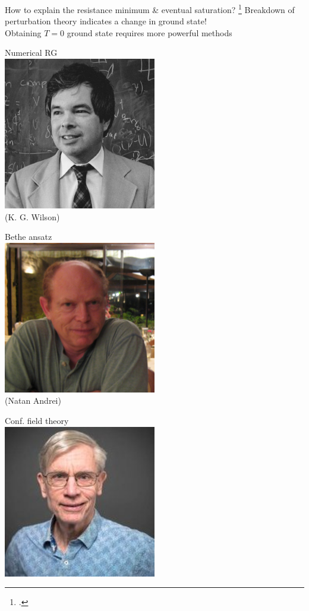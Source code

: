 \documentclass[10pt,aspectratio=169]{beamer}
\begin{document}
\begin{frame}{How to explain the resistance minimum \& eventual saturation?}
\footcite{wilson1975,andrei_1980,Wiegmann_1981,affleck1995conformal}
Breakdown of perturbation theory indicates a \alert{change in ground state}!\\[10pt]
Obtaining \(T=0\) ground state requires more \alert{powerful  methods}\\[10pt]

\begin{minipage}{0.2\textwidth}
\centering
Numerical RG\\[10pt]
\includegraphics[width=0.5\textwidth]{wilson.jpg}\\
\footnotesize{(K. G. Wilson)}
\end{minipage}
\begin{minipage}{0.2\textwidth}
\centering
Bethe ansatz\\[10pt]
\includegraphics[width=0.5\textwidth]{AndreiN.jpg}\\
\footnotesize{(Natan Andrei)}
\end{minipage}
\begin{minipage}{0.2\textwidth}
\centering
Conf. field theory\\[10pt]
\includegraphics[width=0.5\textwidth]{affleck.jpg}\\

\end{minipage}
\end{frame}
\end{document}
